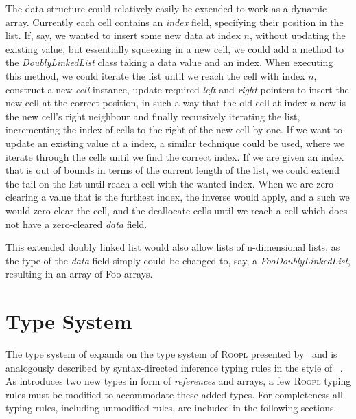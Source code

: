 The data structure could relatively easily be extended to work as a dynamic array. Currently each cell contains an \textit{index} field, specifying their position in the list. If, say, we wanted to insert some new data at index $n$, without updating the existing value, but essentially squeezing in a new cell, we could add a method to the \textit{DoublyLinkedList} class taking a data value and an index. When executing this method, we could iterate the list until we reach the cell with index $n$, construct a new \textit{cell} instance, update required \textit{left} and \textit{right} pointers to insert the new cell at the correct position, in such a way that the old cell at index $n$ now is the new cell's right neighbour and finally recursively iterating the list, incrementing the index of cells to the right of the new cell by one. If we want to update an existing value at a index, a similar technique could be used, where we iterate through the cells until we find the correct index. If we are given an index that is out of bounds in terms of the current length of the list, we could extend the tail on the list until reach a cell with the wanted index. When we are zero-clearing a value that is the furthest index, the inverse would apply, and a such we would zero-clear the cell, and the deallocate cells until we reach a cell which does not have a zero-cleared \textit{data} field. 

This extended doubly linked list would also allow lists of n-dimensional lists, as the type of the \textit{data} field simply could be changed to, say, a \textit{FooDoublyLinkedList}, resulting in an array of Foo arrays. 


\newpage
\section{Type System}
\label{sec:type-system}
The type system of \rooplpp expands on the type system of \textsc{Roopl} presented by~\citeauthor{th:roopl}\cite{th:roopl} and is analogously described by syntax-directed inference typing rules in the style of ~\citeauthor{wi:semantics}\cite{wi:semantics}. As \rooplpp introduces two new types in form of \textit{references} and arrays, a few \textsc{Roopl} typing rules must be modified to accommodate these added types. For completeness all typing rules, including unmodified rules, are included in the following sections. 

